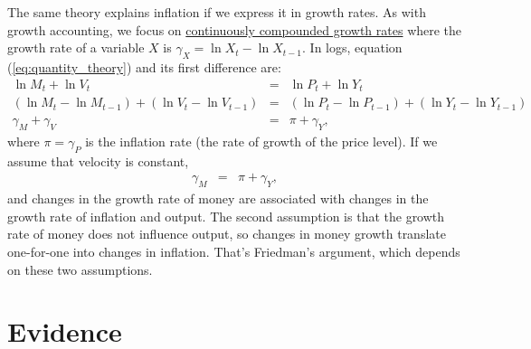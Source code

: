 The same theory explains inflation if we express it in growth rates.
As with growth accounting, we focus on \hyperref[sec:growth_math_cc]{continuously compounded growth rates} where the growth rate of a variable $X$ is
$ \gamma_X = \ln X_t - \ln X_{t-1}$.
In logs, equation (\ref{eq:quantity_theory}) and its first difference are:
%
\begin{eqnarray*}
    \ln M_t + \ln V_t &=& \ln P_t + \ln Y_t \\
    (\ln M_t - \ln M_{t-1})  + (\ln V_t - \ln V_{t-1})
                 &=& (\ln P_t - \ln P_{t-1}) + (\ln Y_t - \ln Y_{t-1})\\
    \gamma_M  + \gamma_V &=&  \pi + \gamma_Y ,
\end{eqnarray*}
%
where $\pi = \gamma_P $ is the inflation rate
(the rate of growth of the price level).
If we assume that velocity is constant,
\begin{eqnarray}
    \gamma_M   &=&  \pi + \gamma_Y ,
    \label{eq:quantity_theory-growth}
\end{eqnarray}
and changes in the growth rate of money are associated
with changes in the growth rate of inflation and output.
The second assumption is that the growth rate of money does not influence
output, so changes in money growth translate one-for-one
into changes in inflation.
That's Friedman's argument, which depends on these two assumptions.


\section{Evidence}

